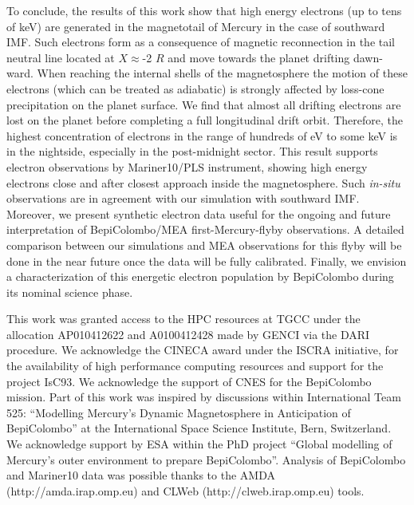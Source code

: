 \documentclass{aa}
\begin{document}
To conclude, the results of this work show that high energy electrons (up to tens of keV) are generated in the magnetotail of Mercury in the case of southward IMF. Such electrons form as a consequence of magnetic reconnection in the tail neutral line located at $X\approx$-2 $R$ and move towards the planet drifting dawn-ward. When reaching the internal shells of the magnetosphere the motion of these electrons (which can be treated as adiabatic) is strongly affected by loss-cone precipitation on the planet surface. We find that almost all drifting electrons are lost on the planet before completing a full longitudinal drift orbit. Therefore, the highest concentration of electrons in the range of hundreds of eV to some keV is in the nightside, especially in the post-midnight sector.
This result supports electron observations by Mariner10/PLS instrument, showing high energy electrons close and after closest approach inside the magnetosphere. Such \textit{in-situ} observations are in agreement with our simulation with southward IMF. Moreover, we present synthetic electron data useful for the ongoing and future interpretation of BepiColombo/MEA first-Mercury-flyby observations. A detailed comparison between our simulations and MEA observations for this flyby will be done in the near future once the data will be fully calibrated. Finally, we envision a characterization of this energetic electron population by BepiColombo during its nominal science phase.



\begin{acknowledgements}
This work was granted access to the HPC resources at TGCC under the allocation AP010412622 and A0100412428 made by GENCI via the DARI procedure.
We acknowledge the CINECA award under the ISCRA initiative, for the availability of high performance computing resources and support for the project IsC93.
We acknowledge the support of CNES for the BepiColombo mission.
Part of this work was inspired by discussions within International Team 525: ``Modelling Mercury's Dynamic Magnetosphere in Anticipation of BepiColombo'' at the International Space Science Institute, Bern, Switzerland.
We acknowledge support by ESA within the PhD project ``Global modelling of Mercury's outer environment to prepare BepiColombo''.
Analysis of BepiColombo and Mariner10 data was possible thanks to the AMDA (http://amda.irap.omp.eu) and CLWeb (http://clweb.irap.omp.eu) tools.
\end{acknowledgements}




\end{document}
